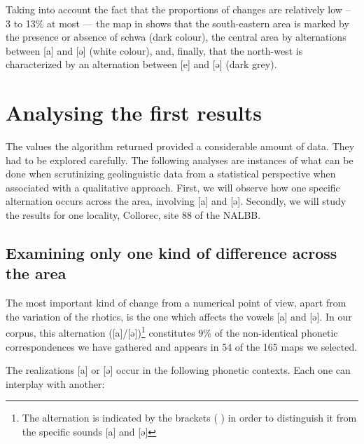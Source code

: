 \documentclass[output=paper]{LSP/langsci}
\begin{document}
Taking into account the fact that the proportions of changes are relatively low – 3 to 13\% at most — the map in  shows that the south-eastern area is marked by the presence or absence of schwa (dark colour), the central area by alternations between [a] and [ə] (white colour), and, finally, that the north-west is characterized by an alternation between [e] and [ə] (dark grey).

\section{Analysing the first results }

The values the algorithm returned provided a considerable amount of data. They had to be explored carefully. The following analyses are instances of what can be done when scrutinizing geolinguistic data from a statistical perspective when associated with a qualitative approach. First, we will observe how one specific alternation occurs across the area, involving [a] and [ə]. Secondly, we will study the results for one locality, Collorec, site 88 of the NALBB.

\subsection[Examining only one kind of difference across the area ]{Examining only one kind of difference across the area }

The most important kind of change from a numerical point of view, apart from the variation of the rhotics, is the one which affects the vowels [a] and [ə]. In our corpus, this alternation ([a]/[ə])\footnote{ The alternation is indicated by the brackets ( ) in order to distinguish it from the specific sounds [a] and [ə]} constitutes 9\% of the non-identical phonetic correspondences we have gathered and appears in 54 of the 165 maps we selected.

The realizations [a] or [ə] occur in the following phonetic contexts. Each one can interplay with another:
\end{document}
